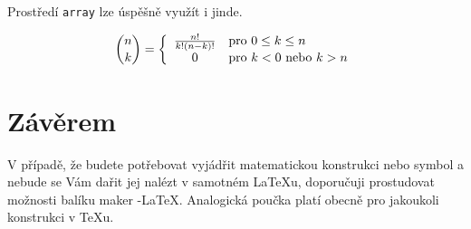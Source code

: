 \documentclass[a4paper,11pt,twocolumn]{article}
\begin{document}
Prostředí \verb|array| lze úspěšně využít i jinde.

$$ 
{{n}\choose{k}}=\left\{
\begin{array}{c l}
\frac{n!}{k!(n-k)!} & \text{pro } 0 \leq k \leq n \\
0 & \text{pro } k < 0 \text { nebo } k>n
\end{array} \right. 
$$

\section{Závěrem}
\noindent V případě, že budete potřebovat vyjádřit matematickou konstrukci nebo symbol a nebude se Vám dařit jej nalézt v samotném \LaTeX u, doporučuji prostudovat možnosti balíku maker \AmS-\LaTeX.
Analogická poučka platí obecně pro jakoukoli konstrukci v \TeX u.
\end{document}
